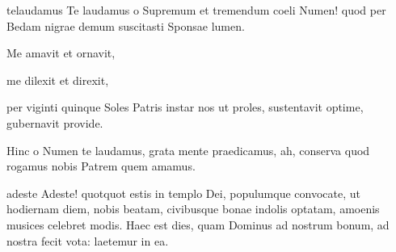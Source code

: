 \documentclass{ees}
\begin{document}
{\begin{movement}{telaudamus}
  \voice[Coro]
  Te laudamus o Supremum
  et tremendum coeli Numen!
  quod per Bedam nigrae demum
  suscitasti Sponsae lumen.

  Me amavit et ornavit,

  \voice[Levita]
  me dilexit et direxit,

  per viginti quinque Soles
  Patris instar nos ut proles,
  sustentavit optime,
  gubernavit provide.

  \voice[Coro]
  Hinc o Numen te laudamus,
  grata mente praedicamus,
  ah, conserva quod rogamus
  nobis Patrem quem amamus.
\end{movement}

\begin{movement}{adeste}
  Adeste!
  quotquot estis in templo Dei,
  populumque convocate,
  ut hodiernam diem, nobis beatam,
  civibusque bonae indolis optatam,
  amoenis musices celebret modis.
  Haec est dies, quam Dominus ad nostrum bonum,
  ad nostra fecit vota: laetemur in ea.
\end{movement}



}

\eesScore
\end{document}
